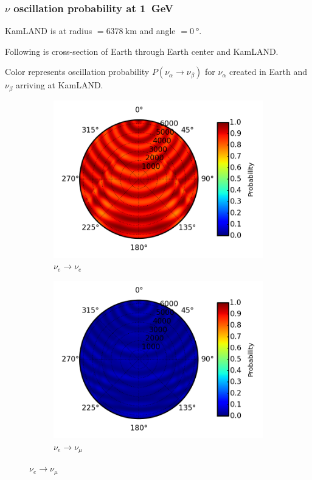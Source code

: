 \documentclass{beamer}
\begin{document}
\begin{frame}
	\frametitle{$\nu$ oscillation probability at \SI{1}{GeV}}
	KamLAND is at radius $= \SI{6378}{\kilo\meter}$ and angle $=
	\SI{0}{\degree}$.

	Following is cross-section of Earth through Earth center and KamLAND.

	Color represents oscillation probability $P(\nu_{\alpha} \rightarrow
	\nu_{\beta})$ for $\nu_{\alpha}$ created in Earth and $\nu_{\beta}$ arriving
	at KamLAND.
	\begin{figure}
		\centering
		\begin{subfigure}[b]{0.49\linewidth}
			\caption{ $\nu_{e} \rightarrow \nu_{e}$ }
			\includegraphics[width=\linewidth]{earth_1.0gev_nue2nue_throughEarth.png}
		\end{subfigure}
		\begin{subfigure}[b]{0.49\linewidth}
			\caption{ $\nu_{e} \rightarrow \nu_{\mu}$ }
			\includegraphics[width=\linewidth]{earth_1.0gev_nue2numu_throughEarth.png}
		\end{subfigure}
	\end{figure}
\end{frame}
\end{document}
